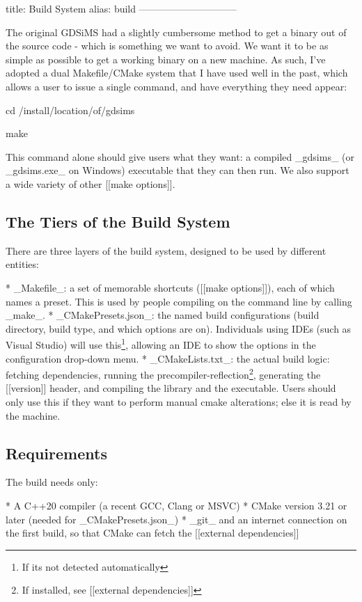 title: Build System
alias: build
------------------------------

The original GDSiMS had a slightly cumbersome method to get a binary out of the source code - which is something we want to avoid. We want it to be as simple as possible to get a working binary on a new machine. As such, I've adopted a dual Makefile/CMake system that I have used well in the past, which allows a user to issue a single command, and have everything they need appear:

\begin{Code}
	cd /install/location/of/gdsims

	make
\end{Code}

This command alone should give users what they want: a compiled _gdsims_ (or _gdsims.exe_ on Windows) executable that they can then run. We also support a wide variety of other [[make options]].


\subsection{The Tiers of the Build System}

	There are three layers of the build system, designed to be used by different entities:

	* _Makefile_: a set of memorable shortcuts ([[make options]]), each of which names a preset. This is used by people compiling on the command line by calling _make_.
	* _CMakePresets.json_: the named build configurations (build directory, build type, and which options are on). Individuals using IDEs (such as Visual Studio) will use this\footnote{If its not detected automatically}, allowing an IDE to show the options in the configuration drop-down menu.
	* _CMakeLists.txt_: the actual build logic: fetching dependencies, running the precompiler-reflection\footnote{If installed, see [[external dependencies]]}, generating the [[version]] header, and compiling the library and the executable. Users should only use this if they want to perform manual cmake alterations; else it is read by the machine.
\subsection{Requirements}

	The build needs only:

	* A C++20 compiler (a recent GCC, Clang or MSVC)
	* CMake version 3.21 or later (needed for _CMakePresets.json_)
	* _git_ and an internet connection on the first build, so that CMake can fetch the [[external dependencies]]




